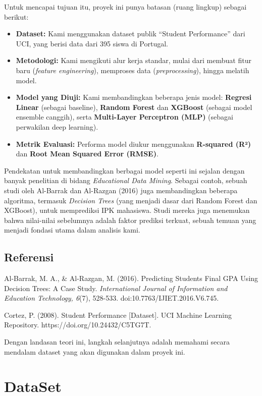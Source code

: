 Untuk mencapai tujuan itu, proyek ini punya batasan (ruang lingkup) sebagai berikut:
\begin{itemize}
    \item \textbf{Dataset:} Kami menggunakan dataset publik ``Student Performance'' dari UCI, yang berisi data dari 395 siswa di Portugal.
    \item \textbf{Metodologi:} Kami mengikuti alur kerja standar, mulai dari membuat fitur baru (\textit{feature engineering}), memproses data (\textit{preprocessing}), hingga melatih model.
    \item \textbf{Model yang Diuji:} Kami membandingkan beberapa jenis model: \textbf{Regresi Linear} (sebagai baseline), \textbf{Random Forest} dan \textbf{XGBoost} (sebagai model ensemble canggih), serta \textbf{Multi-Layer Perceptron (MLP)} (sebagai perwakilan deep learning).
    \item \textbf{Metrik Evaluasi:} Performa model diukur menggunakan \textbf{R-squared (R²)} dan \textbf{Root Mean Squared Error (RMSE)}.
\end{itemize}

Pendekatan untuk membandingkan berbagai model seperti ini sejalan dengan banyak penelitian di bidang \textit{Educational Data Mining}. Sebagai contoh, sebuah studi oleh Al-Barrak dan Al-Razgan (2016) juga membandingkan beberapa algoritma, termasuk \textit{Decision Trees} (yang menjadi dasar dari Random Forest dan XGBoost), untuk memprediksi IPK mahasiswa. Studi mereka juga menemukan bahwa nilai-nilai sebelumnya adalah faktor prediksi terkuat, sebuah temuan yang menjadi fondasi utama dalam analisis kami.

\section*{Referensi}
Al-Barrak, M. A., \& Al-Razgan, M. (2016). Predicting Students Final GPA Using Decision Trees: A Case Study. \textit{International Journal of Information and Education Technology, 6}(7), 528-533. doi:10.7763/IJIET.2016.V6.745.

\vspace{0.2cm}
Cortez, P. (2008). Student Performance [Dataset]. UCI Machine Learning Repository. https://doi.org/10.24432/C5TG7T.

\vspace{0.5cm}
Dengan landasan teori ini, langkah selanjutnya adalah memahami secara mendalam dataset yang akan digunakan dalam proyek ini.

\chapter*{DataSet}


